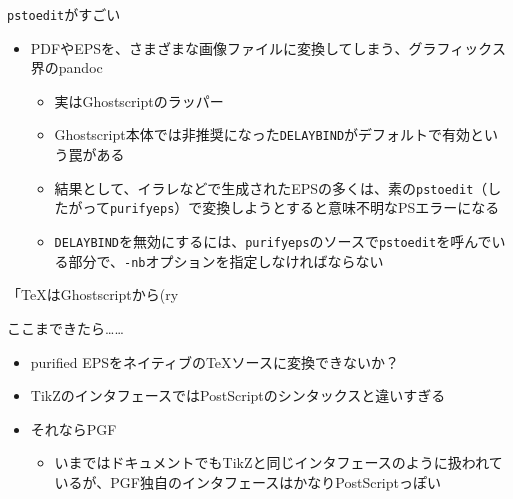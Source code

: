 \documentclass[14pt,dvipdfmx,uplatex]{beamer}
\begin{document}
\begin{frame}[t,fragile=singleslide]{\inhibitglue \texttt{pstoedit}がすごい}
  \sffamily
  \begin{itemize}
    \item PDFやEPSを、さまざまな画像ファイルに変換してしまう、グラフィックス界のpandoc
    \begin{itemize}
      \item 実はGhostscriptのラッパー
      \item Ghostscript本体では非推奨になった\texttt{DELAYBIND}がデフォルトで有効という罠がある
      \item 結果として、イラレなどで生成されたEPSの多くは、素の\texttt{pstoedit}（したがって\texttt{purifyeps}）で変換しようとすると意味不明なPSエラーになる
      \item \texttt{DELAYBIND}を無効にするには、\texttt{purifyeps}のソースで\texttt{pstoedit}を呼んでいる部分で、\texttt{-nb}オプションを指定しなければならない
    \end{itemize}
  \end{itemize}

  \color{black}\yasagoth
  \begin{center}
  「\TeX{}はGhostscriptから(ry
  \end{center}
\end{frame}

\begin{frame}[t,fragile=singleslide]{\inhibitglue ここまできたら……}
  \sffamily
  \begin{itemize}
    \item purified EPSをネイティブの\TeX{}ソースに変換できないか？
    \item TikZのインタフェースではPostScriptのシンタックスと違いすぎる
    \item それなら{\color{red}PGF}
    \begin{itemize}
      \item いまではドキュメントでもTikZと同じインタフェースのように扱われているが、PGF独自のインタフェースはかなりPostScriptっぽい
    \end{itemize}
  \end{itemize}
\end{frame}
\end{document}
